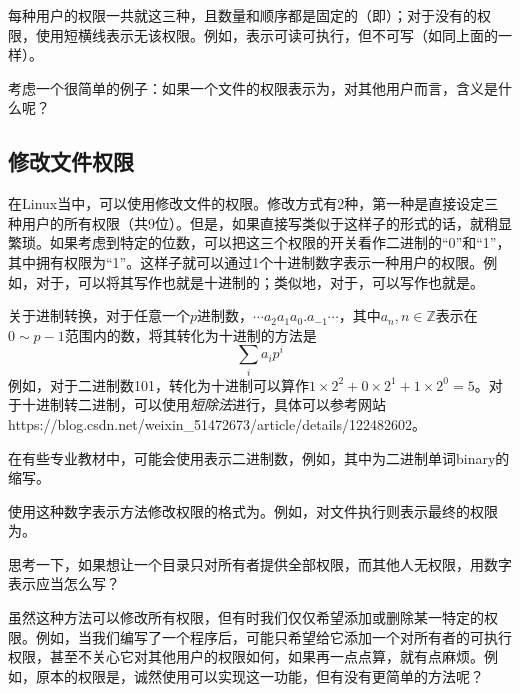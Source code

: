 \begin{attention}
    每种用户的权限一共就这三种，且数量和顺序都是固定的（即）；对于没有的权限，使用短横线\code{-}表示无该权限。例如，表示可读可执行，但不可写（如同上面的一样）。
\end{attention}

考虑一个很简单的例子：如果一个文件的权限表示为，对其他用户而言，含义是什么呢？


\subsection{修改文件权限 }

在Linux当中，可以使用修改文件的权限。修改方式有2种，第一种是直接设定三种用户的所有权限（共9位）。但是，如果直接写类似于这样子的形式的话，就稍显繁琐。如果考虑到特定的位数，可以把这三个权限的开关看作二进制的“0”和“1”，其中拥有权限为“1”。这样子就可以通过1个十进制数字表示一种用户的权限。例如，对于，可以将其写作也就是十进制的；类似地，对于，可以写作也就是。

\begin{extend}
    关于进制转换，对于任意一个$p$进制数，$\cdots a_2a_1a_0.a_{-1}\cdots$，其中$a_n,n\in\mathbb{Z}$表示在$0\sim p-1$范围内的数，将其转化为十进制的方法是
    \begin{equation*}
        \sum_ia_ip^i
    \end{equation*}
    例如，对于二进制数101，转化为十进制可以算作$1\times2^2+0\times2^1+1\times2^0=5$。对于十进制转二进制，可以使用\emph{短除法}进行，具体可以参考网站https://blog.csdn.net/weixin\_51472673/article/details/122482602。

    在有些专业教材中，可能会使用表示二进制数，例如，其中为二进制单词binary的缩写。
\end{extend}

使用这种数字表示方法修改权限的格式为。例如，对文件执行则表示最终的权限为。

思考一下，如果想让一个目录只对所有者提供全部权限，而其他人无权限，用数字表示应当怎么写？


虽然这种方法可以修改所有权限，但有时我们仅仅希望添加或删除某一特定的权限。例如，当我们编写了一个程序后，可能只希望给它添加一个对所有者的可执行权限，甚至不关心它对其他用户的权限如何，如果再一点点算，就有点麻烦。例如，原本的权限是，诚然使用可以实现这一功能，但有没有更简单的方法呢？

